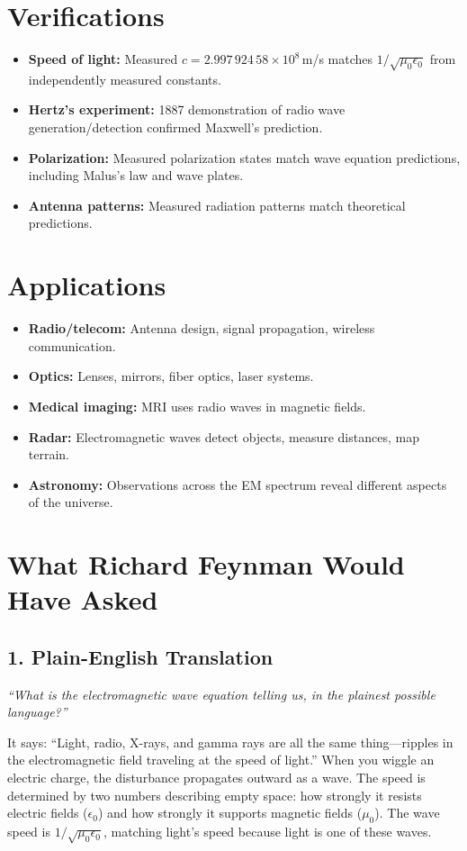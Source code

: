 \section*{Verifications}

\begin{itemize}
\item \textbf{Speed of light:} Measured $c = 2.997\,924\,58 \times 10^8$\,m/s matches $1/\sqrt{\mu_0 \epsilon_0}$ from independently measured constants.
\item \textbf{Hertz's experiment:} 1887 demonstration of radio wave generation/detection confirmed Maxwell's prediction.
\item \textbf{Polarization:} Measured polarization states match wave equation predictions, including Malus's law and wave plates.
\item \textbf{Antenna patterns:} Measured radiation patterns match theoretical predictions.
\end{itemize}
\section*{Applications}

\begin{itemize}
\item \textbf{Radio/telecom:} Antenna design, signal propagation, wireless communication.
\item \textbf{Optics:} Lenses, mirrors, fiber optics, laser systems.
\item \textbf{Medical imaging:} MRI uses radio waves in magnetic fields.
\item \textbf{Radar:} Electromagnetic waves detect objects, measure distances, map terrain.
\item \textbf{Astronomy:} Observations across the EM spectrum reveal different aspects of the universe.
\end{itemize}
\section*{What Richard Feynman Would Have Asked}

\subsection*{1. Plain-English Translation}
\textit{``What is the electromagnetic wave equation telling us, in the plainest possible language?''}

It says: ``Light, radio, X-rays, and gamma rays are all the same thing---ripples in the electromagnetic field traveling at the speed of light.'' When you wiggle an electric charge, the disturbance propagates outward as a wave. The speed is determined by two numbers describing empty space: how strongly it resists electric fields ($\epsilon_0$) and how strongly it supports magnetic fields ($\mu_0$). The wave speed is $1/\sqrt{\mu_0 \epsilon_0}$, matching light's speed because light is one of these waves.

